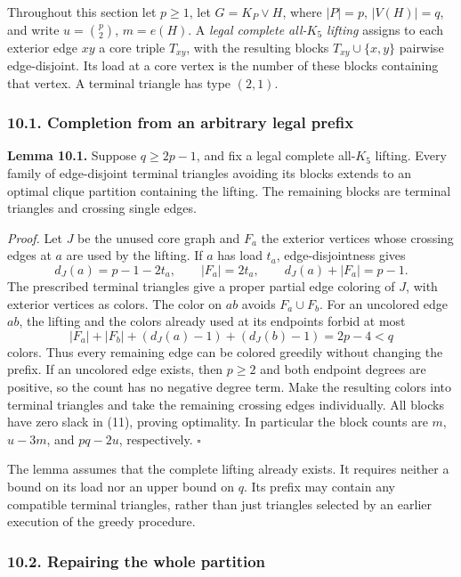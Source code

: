 \documentclass[english,11pt,a4paper]{article}
\begin{document}
Throughout this section let \(p\ge1\), let \(G=K_P\vee H\), where
\(|P|=p\), \(|V(H)|=q\), and write \(u=\binom p2\), \(m=e(H)\). A
\emph{legal complete all-\(K_5\) lifting} assigns to each exterior edge
\(xy\) a core triple \(T_{xy}\), with the resulting blocks
\(T_{xy}\cup\{x,y\}\) pairwise edge-disjoint. Its load at a core vertex
is the number of these blocks containing that vertex. A terminal
triangle has type \((2,1)\).

\subsubsection{10.1. Completion from an arbitrary legal
prefix}\label{completion-from-an-arbitrary-legal-prefix}

\textbf{Lemma 10.1.} Suppose \(q\ge2p-1\), and fix a legal complete
all-\(K_5\) lifting. Every family of edge-disjoint terminal triangles
avoiding its blocks extends to an optimal clique partition containing
the lifting. The remaining blocks are terminal triangles and crossing
single edges.

\emph{Proof.} Let \(J\) be the unused core graph and \(F_a\) the
exterior vertices whose crossing edges at \(a\) are used by the lifting.
If \(a\) has load \(t_a\), edge-disjointness gives \[
d_J(a)=p-1-2t_a,\qquad |F_a|=2t_a,
\qquad d_J(a)+|F_a|=p-1.
\] The prescribed terminal triangles give a proper partial edge coloring
of \(J\), with exterior vertices as colors. The color on \(ab\) avoids
\(F_a\cup F_b\). For an uncolored edge \(ab\), the lifting and the
colors already used at its endpoints forbid at most \[
|F_a|+|F_b|+(d_J(a)-1)+(d_J(b)-1)=2p-4<q
\] colors. Thus every remaining edge can be colored greedily without
changing the prefix. If an uncolored edge exists, then \(p\ge2\) and
both endpoint degrees are positive, so the count has no negative degree
term. Make the resulting colors into terminal triangles and take the
remaining crossing edges individually. All blocks have zero slack in
(11), proving optimality. In particular the block counts are \(m\),
\(u-3m\), and \(pq-2u\), respectively. \(\square\)

The lemma assumes that the complete lifting already exists. It requires
neither a bound on its load nor an upper bound on \(q\). Its prefix may
contain any compatible terminal triangles, rather than just triangles
selected by an earlier execution of the greedy procedure.

\subsubsection{10.2. Repairing the whole
partition}\label{repairing-the-whole-partition}
\end{document}
